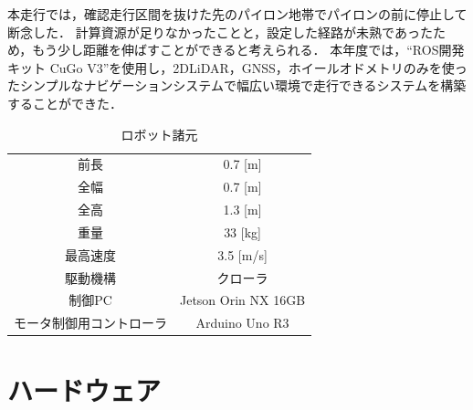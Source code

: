 \documentclass[platex,dvipdfmx]{rbproceedings}
\begin{document}
本走行では，確認走行区間を抜けた先のパイロン地帯でパイロンの前に停止して断念した．
計算資源が足りなかったことと，設定した経路が未熟であったため，もう少し距離を伸ばすことができると考えられる．
本年度では，“ROS開発キット CuGo V3”を使用し，2DLiDAR，GNSS，ホイールオドメトリのみを使ったシンプルなナビゲーションシステムで幅広い環境で走行できるシステムを構築することができた．

\begin{table}[btp]
    \centering
    \caption{ロボット諸元}
    \label{tab:cugo_ros_tsukuba_spec}
    \begin{tabular}{cc}
        \hline
        前長     & 0.7 [m] \\
        全幅     & 0.7 [m] \\
        全高     & 1.3 [m] \\
        重量     & 33  [kg] \\
        最高速度 & 3.5 [m/s] \\
        駆動機構 & クローラ \\
        制御PC   & Jetson Orin NX 16GB \\
        モータ制御用コントローラ & Arduino Uno R3 \\
        \hline
    \end{tabular}
\end{table}


\section{ハードウェア}
\end{document}
